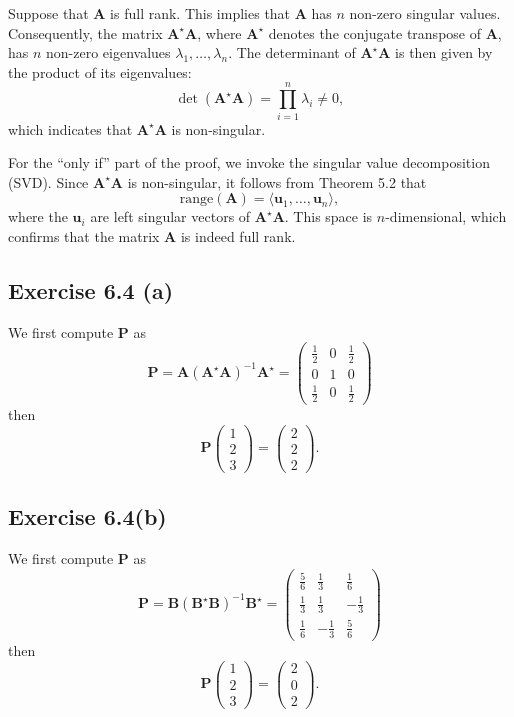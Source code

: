 \documentclass{article}
\begin{document}
Suppose that $\bm{A}$ is full rank. This implies that $\bm{A}$ has $n$ non-zero singular values. Consequently, the matrix $\bm{A}^\star \bm{A}$, where $\bm{A}^\star$ denotes the conjugate transpose of $\bm{A}$, has $n$ non-zero eigenvalues $\lambda_1, \ldots, \lambda_n$. The determinant of $\bm{A}^\star \bm{A}$ is then given by the product of its eigenvalues:
\[
\det(\bm{A}^\star \bm{A}) = \prod_{i=1}^n \lambda_i \neq 0,
\]
which indicates that $\bm{A}^\star \bm{A}$ is non-singular.

For the ``only if'' part of the proof, we invoke the singular value decomposition (SVD). Since $\bm{A}^\star \bm{A}$ is non-singular, it follows from Theorem 5.2 that
\[
\mathrm{range}(\bm{A}) = \langle \bm{u}_1, \ldots, \bm{u}_n \rangle,
\]
where the $\bm{u}_i$ are left singular vectors of $\bm{A}^\star \bm{A}$. This space is $n$-dimensional, which confirms that the matrix $\bm{A}$ is indeed full rank.


\subsection{Exercise 6.4 (a) }
We first compute $\bm{P}$ as 
$$
\bm{P} = \bm{A} (\bm{A}^\star \bm{A} )^{-1} \bm{A}^\star = 
\begin{pmatrix}
	\frac{1}{2} & 0 & \frac{1}{2}\\
	0 & 1 & 0 \\
	\frac{1}{2} & 0 & \frac{1}{2}
\end{pmatrix} 
$$
then 
$$
\bm{P} \begin{pmatrix}
	1 \\
	2\\
	3
\end{pmatrix} = \begin{pmatrix}
2 \\
2\\
2
\end{pmatrix}.
$$

\subsection{Exercise 6.4(b) }
We first compute $\bm{P}$ as 
$$
\bm{P} = \bm{B} (\bm{B}^\star \bm{B} )^{-1} \bm{B}^\star = 
\begin{pmatrix}
	\frac{5}{6} & \frac{1}{3} & \frac{1}{6}\\
	\frac{1}{3} & \frac{1}{3} &-\frac{1}{3} \\
	\frac{1}{6} & -\frac{1}{3} & \frac{5}{6}
\end{pmatrix} 
$$
then 
$$
\bm{P} \begin{pmatrix}
	1 \\
	2\\
	3
\end{pmatrix} = \begin{pmatrix}
	2 \\
	0\\
	2
\end{pmatrix}.
$$
\end{document}
